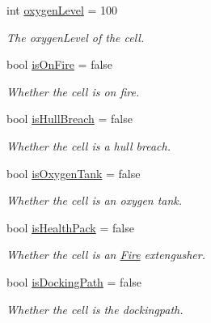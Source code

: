 \begin{DoxyCompactItemize}
\mbox{\label{class_cell_aaa5ccf51c9cd5d1500af0f7481b5588e}} 
int \hyperlink{class_cell_aaa5ccf51c9cd5d1500af0f7481b5588e}{oxygen\+Level} = 100
\begin{DoxyCompactList}\small\item\em The oxygen\+Level of the cell. \end{DoxyCompactList}\item 
\mbox{\label{class_cell_a6cc1b533215a2fe1a0ba96265b43997f}} 
bool \hyperlink{class_cell_a6cc1b533215a2fe1a0ba96265b43997f}{is\+On\+Fire} = false
\begin{DoxyCompactList}\small\item\em Whether the cell is on fire. \end{DoxyCompactList}\item 
\mbox{\label{class_cell_a408414f3a38c859dec3df3a6bd05bb1f}} 
bool \hyperlink{class_cell_a408414f3a38c859dec3df3a6bd05bb1f}{is\+Hull\+Breach} = false
\begin{DoxyCompactList}\small\item\em Whether the cell is a hull breach. \end{DoxyCompactList}\item 
\mbox{\label{class_cell_ab789483cf35f76b8f90b1460330f7f80}} 
bool \hyperlink{class_cell_ab789483cf35f76b8f90b1460330f7f80}{is\+Oxygen\+Tank} = false
\begin{DoxyCompactList}\small\item\em Whether the cell is an oxygen tank. \end{DoxyCompactList}\item 
\mbox{\label{class_cell_a865f48549b919d63c44672d06eddc03a}} 
bool \hyperlink{class_cell_a865f48549b919d63c44672d06eddc03a}{is\+Health\+Pack} = false
\begin{DoxyCompactList}\small\item\em Whether the cell is an \hyperlink{class_fire}{Fire} extengusher. \end{DoxyCompactList}\item 
\mbox{\label{class_cell_af7efe7d40df1cd80a589820bb2c1b388}} 
bool \hyperlink{class_cell_af7efe7d40df1cd80a589820bb2c1b388}{is\+Docking\+Path} = false
\begin{DoxyCompactList}\small\item\em Whether the cell is the dockingpath. \end{DoxyCompactList}\item 

\end{DoxyCompactItemize}
